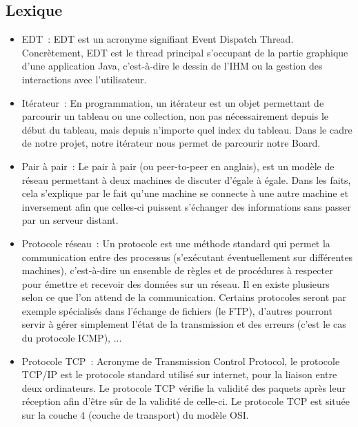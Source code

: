 \newpage
\begin{appendices}
\section{Lexique}
\begin{itemize}
	\item EDT~:
	EDT est un acronyme signifiant Event Dispatch Thread. Concrètement, EDT est le thread principal s'occupant de la partie graphique d'une application Java, c'est-à-dire le dessin de l'IHM ou la gestion des interactions avec l'utilisateur.
	\newline

	\item Itérateur~:
	En programmation, un itérateur est un objet permettant de parcourir un tableau ou une collection, non pas nécessairement depuis le début du tableau, mais depuis n'importe quel index du tableau. Dans le cadre de notre projet, notre itérateur nous permet de parcourir notre Board.
	\newline

	\item Pair à pair~:
    Le pair à  pair (ou peer-to-peer en anglais), est un modèle de réseau permettant à deux machines de discuter d'égale à égale.
    Dans les faits, cela s'explique par le fait qu'une machine se connecte à une autre machine et inversement afin que celles-ci puissent s'échanger des informations sans passer par un serveur distant.
    \newline
    
   	\item Protocole réseau~:
    Un protocole est une méthode standard qui permet la communication entre des processus (s'exécutant éventuellement sur différentes machines), c'est-à-dire un ensemble de règles et de procédures à respecter pour émettre et recevoir des données sur un réseau. 
    Il en existe plusieurs selon ce que l'on attend de la communication. Certains protocoles seront par exemple spécialisés dans l'échange de fichiers (le FTP), d'autres pourront servir à gérer simplement l'état de la transmission et des erreurs (c'est le cas du protocole ICMP), ... 
	\newline

	\item Protocole TCP~: 
    Acronyme de Transmission Control Protocol, le protocole TCP/IP est le protocole standard utilisé sur internet, pour la liaison entre deux ordinateurs.
    Le protocole TCP vérifie la validité des paquets après leur réception afin d'être sûr de la validité de celle-ci.
    Le protocole TCP est située sur la couche 4 (couche de transport) du modèle OSI. 
	\newline
	

\end{itemize}
\end{appendices}
